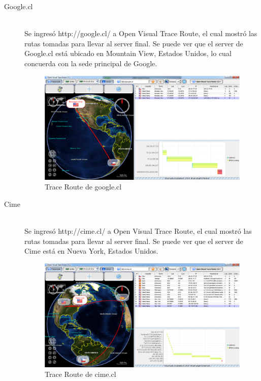\documentclass{article}
\begin{document}
\begin{description}
\item[Google.cl] \hfill \\
Se ingresó http://google.cl/ a Open Visual Trace Route, el cual mostró las rutas tomadas para llevar al server final. Se puede ver que el server de Google.cl está ubicado en Mountain View, Estados Unidos, lo cual concuerda con la sede principal de Google\citep{website:google}.

\begin{figure}[H]
\centering
\includegraphics[width=\textwidth]{tracerouteGoogleCL.png}
\caption{Trace Route de google.cl}
\label{fig:google}
\end{figure}    
  
\item[Cime] \hfill \\
Se ingresó http://cime.cl/ a Open Visual Trace Route, el cual mostró las rutas tomadas para llevar al server final. Se puede ver que el server de Cime está en Nueva York, Estados Unidos.

\begin{figure}[H]
\centering
\includegraphics[width=\textwidth]{tracerouteCime.png}
\caption{Trace Route de cime.cl}
\label{fig:cime}
\end{figure}    


\end{description}
\end{document}
